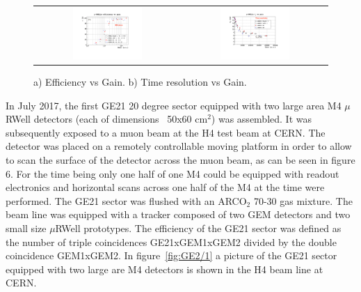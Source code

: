 %
\begin{figure}[h!]
\centering
\begin{tabular}{cc}
\includegraphics[width=0.5\textwidth]{Figures/Muon/microrwell-eff-gain.pdf} &
\includegraphics[width=0.5\textwidth]{Figures/Muon/microrwell-time-resolution-vs-gain.pdf} \\
\end{tabular}
\caption{a) Efficiency vs Gain. b) Time resolution vs Gain.}
\label{fig:urwell-eff-gain}
\end{figure}

In July 2017, the first GE21 20 degree sector equipped with two large area M4 $\mu$RWell detectors (each of dimensions ~50x60 cm$^2$) was assembled. It was subsequently exposed to a muon beam at the H4 test beam at CERN. The detector was placed on a remotely controllable moving platform in order to allow to scan the surface of the detector across the muon beam, as can be seen in figure 6. For the time being only one half of one M4 could be equipped with readout electronics and horizontal scans across one half of the M4 at the time were performed. The GE21 sector was flushed with an ARCO$_2$ 70-30 gas mixture. The beam line was equipped with a tracker composed of two GEM detectors and two small size $\mu$RWell prototypes. The efficiency of the GE21 sector was defined as the number of triple coincidences GE21xGEM1xGEM2 divided by the double coincidence GEM1xGEM2.
In figure~\ref{fig:GE2/1} a picture of the GE21 sector equipped with two large are M4 detectors is shown in the H4 beam line at CERN.

